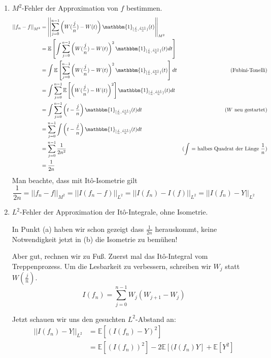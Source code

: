 \documentclass[a4paper,11pt,notitlepage,fullpage]{article}
\newcommand{\Ee}[1]{\mathbb E\left[#1\right]}
\newcommand{\indd}[1]{\mathbbm{1}_{#1}}
\newcommand{\norm}[2]{\left|\left|{#1}\right|\right|_{#2}}
\begin{document}
\begin{enumerate}
\begin{enumerate}
\item $M^2$-Fehler der Approximation von $f$ bestimmen.
\begin{align*}
\norm{f_n-f}{M^2} &= \norm{\sum_{j=0}^{n-1} \left(W(\frac{j}{n})-W(t)\right) \indd{[\frac{j}{n}, \frac{j+1}{n})}(t)}{M^2}\\
&= \Ee{\int \sum_{j=0}^{n-1} \left(W(\frac{j}{n})-W(t)\right)^2 \indd{[\frac{j}{n}, \frac{j+1}{n})}(t) dt}\\
&= \int \Ee{\sum_{j=0}^{n-1} \left(W(\frac{j}{n})-W(t)\right)^2 \indd{[\frac{j}{n}, \frac{j+1}{n})}(t) } dt &\text{(Fubini-Tonelli)}\\
&= \int \sum_{j=0}^{n-1} \Ee{\left(W(\frac{j}{n})-W(t)\right)^2} \indd{[\frac{j}{n}, \frac{j+1}{n})}(t)  dt\\
&= \int \sum_{j=0}^{n-1} \left(t-\frac{j}{n}\right) \indd{[\frac{j}{n}, \frac{j+1}{n})}(t)  dt & \text{($W$ neu gestartet)}\\
&=  \sum_{j=0}^{n-1} \int\left(t-\frac{j}{n}\right) \indd{[\frac{j}{n}, \frac{j+1}{n})}(t)  dt \\
&=  \sum_{j=0}^{n-1} \frac{1}{2n^2} & \text{($\int$ = halbes Quadrat der Länge $\frac{1}{n}$)}\\
&= \frac{1}{2n}
\end{align*}
Man beachte, dass mit Itô-Isometrie gilt
$$\frac{1}{2n} = \norm{f_n-f}{M^2} = \norm{I(f_n-f)}{L^2} = \norm{I(f_n)-I(f)}{L^2} = \norm{I(f_n)-Y}{L^2}$$

\item $L^2$-Fehler der Approximation der Itô-Integrale, ohne Isometrie.

In Punkt (a) haben wir schon gezeigt dass $\frac{1}{2n}$ herauskommt, keine Notwendigkeit jetzt in (b) die Isometrie zu bemühen!

Aber gut, rechnen wir zu Fuß. Zuerst mal das Itô-Integral vom Treppenprozess. Um die Lesbarkeit zu verbessern, schreiben wir $W_{j}$ statt $W(\frac{j}{n})$.
$$I(f_n) = \sum_{j=0}^{n-1} W_j \left( W_{j+1} - W_j\right)$$

Jetzt schauen wir uns den gesuchten $L^2$-Abstand an:
\begin{align*}
\norm{I(f_n)-Y}{L^2} &= \Ee{(I(f_n) - Y)^2}\\
&= \Ee{(I(f_n))^2} -2\Ee{(I(f_n)Y} + \Ee{Y^2}
\end{align*}


\end{enumerate}
\end{enumerate}
\end{document}
